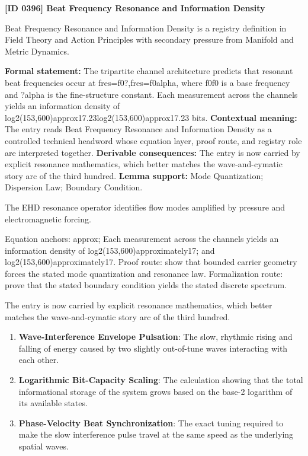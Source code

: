 \clearpage
\noindent\textbf{[ID 0396] Beat Frequency Resonance and Information Density}\par
\vspace{0.35em}
\begingroup\small
{}
Beat Frequency Resonance and Information Density is a registry definition in Field Theory and Action Principles with secondary pressure from Manifold and Metric Dynamics.

\begingroup\footnotesize\setlength{\emergencystretch}{3em}\sloppy
\textbf{Formal statement:} The tripartite channel architecture predicts that resonant beat frequencies occur at fres=f0?,fres=f0alpha, where f0f0 is a base frequency and ?alpha is the fine-structure constant. Each measurement across the channels yields an information density of log2(153,600)approx17.23log2(153,600)approx17.23 bits. \textbf{Contextual meaning:} The entry reads Beat Frequency Resonance and Information Density as a controlled technical headword whose equation layer, proof route, and registry role are interpreted together. \textbf{Derivable consequences:} The entry is now carried by explicit resonance mathematics, which better matches the wave-and-cymatic story arc of the third hundred. \textbf{Lemma support:} Mode Quantization; Dispersion Law; Boundary Condition.\par
\endgroup

The EHD resonance operator identifies flow modes amplified by pressure and electromagnetic forcing.

Equation anchors: approx; Each measurement across the channels yields an information density of log2(153,600)approximately17; and log2(153,600)approximately17. Proof route: show that bounded carrier geometry forces the stated mode quantization and resonance law. Formalization route: prove that the stated boundary condition yields the stated discrete spectrum.

The entry is now carried by explicit resonance mathematics, which better matches the wave-and-cymatic story arc of the third hundred.
\endgroup

\begin{enumerate}[leftmargin=1.6em,itemsep=6pt,topsep=4pt]
\item \textbf{Wave-Interference Envelope Pulsation}: The slow, rhythmic rising and falling of energy caused by two slightly out-of-tune waves interacting with each other.
\item \textbf{Logarithmic Bit-Capacity Scaling}: The calculation showing that the total informational storage of the system grows based on the base-2 logarithm of its available states.
\item \textbf{Phase-Velocity Beat Synchronization}: The exact tuning required to make the slow interference pulse travel at the same speed as the underlying spatial waves.
\end{enumerate}

